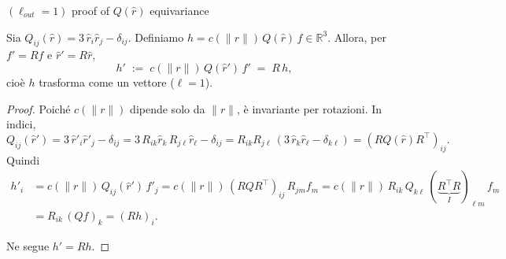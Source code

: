 \documentclass[aspectratio=32,8pt]{beamer}
\begin{document}
\begin{frame}{$(\ell_{out}=1)$ proof of $Q(\hat{r})$ equivariance }
\tiny
\begin{lemma}
Sia $Q_{ij}(\hat r)=3\,\hat r_i \hat r_j - \delta_{ij}$. Definiamo $h=c(\|r\|)\,Q(\hat r)\,f\in\mathbb R^3$.
Allora, per $f' = R f$ e $\hat r' = R \hat r$,
\[
h' \;:=\; c(\|r\|)\,Q(\hat r')\,f' \;=\; R\,h,
\]
cio\`e $h$ trasforma come un vettore ($\ell=1$).
\end{lemma}

\begin{proof}
Poich\'e $c(\|r\|)$ dipende solo da $\|r\|$, \`e invariante per rotazioni. In indici,
\[
Q_{ij}(\hat r') = 3\,\hat r'_i \hat r'_j - \delta_{ij}
= 3\,R_{ik}\hat r_k\, R_{j\ell}\hat r_\ell - \delta_{ij}
= R_{ik} R_{j\ell}\,(3\,\hat r_k \hat r_\ell - \delta_{k\ell})
= (R Q(\hat r) R^\top)_{ij}.
\]
Quindi
    \begin{align}\nonumber
        h'_i
&= c(\|r\|)\,Q_{ij}(\hat r')\,f'_j
= c(\|r\|)\,(R Q R^\top)_{ij}\,R_{jm} f_m
= c(\|r\|)\,R_{ik}\,Q_{k\ell}\,(\underbrace{R^\top R}_{I})_{\ell m}\,f_m
\\ &=R_{ik}\,(Q f)_k
= (R h)_i.\nonumber
    \end{align}

Ne segue $h' = R h$.
\end{proof}

    
\end{frame}
\end{document}
